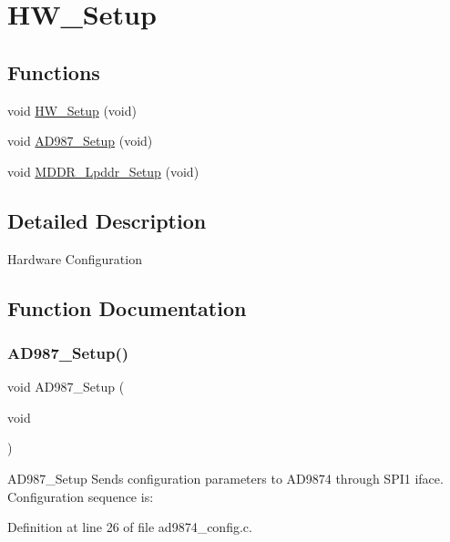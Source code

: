 \hypertarget{group___h_w___setup}{}\section{H\+W\+\_\+\+Setup}
\label{group___h_w___setup}
\subsection*{Functions}
\begin{DoxyCompactItemize}
\item 
void \hyperlink{group___h_w___setup_gaccfffcda3887f124927423457befe196}{H\+W\+\_\+\+Setup} (void)
\item 
void \hyperlink{group___h_w___setup_gafa2312fb8ab73b4e2cd8f53fbc785bb9}{A\+D987\+\_\+\+Setup} (void)
\item 
void \hyperlink{group___h_w___setup_ga289e48a62669d5b08693d32a8ed773a9}{M\+D\+D\+R\+\_\+\+Lpddr\+\_\+\+Setup} (void)
\end{DoxyCompactItemize}


\subsection{Detailed Description}
Hardware Configuration 

\subsection{Function Documentation}
\mbox{\label{group___h_w___setup_gafa2312fb8ab73b4e2cd8f53fbc785bb9}} 
\subsubsection{\texorpdfstring{A\+D987\+\_\+\+Setup()}{AD987\_Setup()}}
{\footnotesize\ttfamily void A\+D987\+\_\+\+Setup (\begin{DoxyParamCaption}\item[{void}]{ }\end{DoxyParamCaption})}

A\+D987\+\_\+\+Setup Sends configuration parameters to A\+D9874 through S\+P\+I1 iface. Configuration sequence is\+: 

Definition at line 26 of file ad9874\+\_\+config.\+c.

